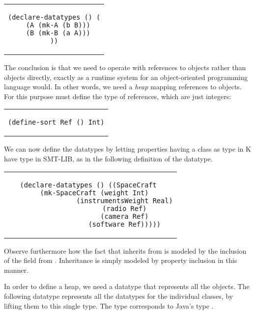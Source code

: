 \lstset{language=SMT,numbers=none}

\begin{center}
\begin{tabular}{c}
\begin{lstlisting}
(declare-datatypes () (
  (A (mk-A (b B)))
  (B (mk-B (a A)))
))
\end{lstlisting}
\end{tabular}
\end{center}

The conclusion is that we need to operate with references to 
objects rather than objects directly, exactly as a runtime system 
for an object-oriented programming language would. In other words, 
we need a {\em heap} mapping references to objects. For this 
purpose must define the type of references, which are just 
integers:

\begin{center}
\begin{tabular}{c}
\begin{lstlisting}
(define-sort Ref () Int)
\end{lstlisting}
\end{tabular}
\end{center}

We can now define the datatypes by letting properties having a 
class as type in K have type  in SMT-LIB, as in the 
following definition of the  datatype.

\begin{center}
\begin{tabular}{c}
\begin{lstlisting}  
(declare-datatypes () ((SpaceCraft 
  (mk-SpaceCraft (weight Int)
                 (instrumentsWeight Real)
                 (radio Ref)
                 (camera Ref)
                 (software Ref)))))
\end{lstlisting}
\end{tabular}
\end{center}

Observe furthermore how the fact that  inherits
from  is modeled by the inclusion of the 
field from . Inheritance is simply modeled by
property inclusion in this manner. 

In order to define a heap, we need a datatype that represents all 
the objects. The following datatype  represents all the 
datatypes for the individual classes, by lifting them to this single type. The type  corresponds to Java's type .

